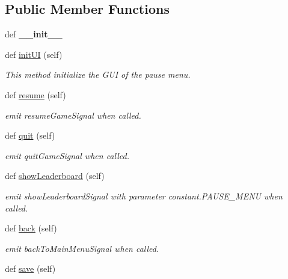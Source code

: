 \subsection*{Public Member Functions}
\begin{DoxyCompactItemize}
\item 
\hypertarget{classsrc_1_1pause__menu_1_1_pause_menu_a50b6571cbb54b07250cf74db412231dd}{}def {\bfseries \+\_\+\+\_\+init\+\_\+\+\_\+}\label{classsrc_1_1pause__menu_1_1_pause_menu_a50b6571cbb54b07250cf74db412231dd}

\item 
def \hyperlink{classsrc_1_1pause__menu_1_1_pause_menu_a9a5e36aa2482be916deefce1f4f23fcb}{init\+U\+I} (self)
\begin{DoxyCompactList}\small\item\em This method initialize the G\+U\+I of the pause menu. \end{DoxyCompactList}\item 
def \hyperlink{classsrc_1_1pause__menu_1_1_pause_menu_aaf160aa602ebd4ec91e9bc32d6d730f9}{resume} (self)
\begin{DoxyCompactList}\small\item\em emit resume\+Game\+Signal when called. \end{DoxyCompactList}\item 
def \hyperlink{classsrc_1_1pause__menu_1_1_pause_menu_a9f29e275aa812da5fad8730a41746677}{quit} (self)
\begin{DoxyCompactList}\small\item\em emit quit\+Game\+Signal when called. \end{DoxyCompactList}\item 
def \hyperlink{classsrc_1_1pause__menu_1_1_pause_menu_a9e3d8c0c94fdf4af682d6988f123888f}{show\+Leaderboard} (self)
\begin{DoxyCompactList}\small\item\em emit show\+Leaderboard\+Signal with parameter \textquotesingle{}constant.\+P\+A\+U\+S\+E\+\_\+\+M\+E\+N\+U\textquotesingle{} when called. \end{DoxyCompactList}\item 
def \hyperlink{classsrc_1_1pause__menu_1_1_pause_menu_affa6df962a7284b81fa60171119585b1}{back} (self)
\begin{DoxyCompactList}\small\item\em emit back\+To\+Main\+Menu\+Signal when called. \end{DoxyCompactList}\item 
def \hyperlink{classsrc_1_1pause__menu_1_1_pause_menu_a6950e08a6f9a87c87e9b77d606117eef}{save} (self)

\end{DoxyCompactItemize}
